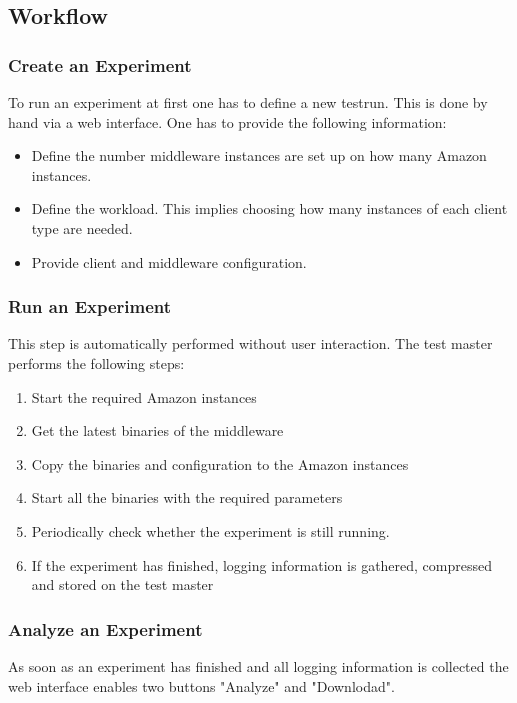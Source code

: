 \documentclass[a4paper]{article}
\begin{document}

\subsection{Workflow}

\subsubsection{Create an Experiment}
To run an experiment at first one has to define a new testrun. This is done by hand via a web interface. One has to provide the following information:

\begin{itemize}
\item Define the number middleware instances are set up on how many Amazon instances.
\item Define the workload. This implies choosing how many instances of each client type are needed.
\item Provide client and middleware configuration.
\end{itemize}

\subsubsection{Run an Experiment}
This step is automatically performed without user interaction. The test master performs the following steps:

\begin{enumerate}
\item Start the required Amazon instances
\item Get the latest binaries of the middleware
\item Copy the binaries and configuration to the Amazon instances
\item Start all the binaries with the required parameters
\item Periodically check whether the experiment is still running.
\item If the experiment has finished, logging information is gathered, compressed and stored on the test master
\end{enumerate}

\subsubsection{Analyze an Experiment}
As soon as an experiment has finished and all logging information is collected the web interface enables two buttons "Analyze" and "Downlodad". 
\end{document}
